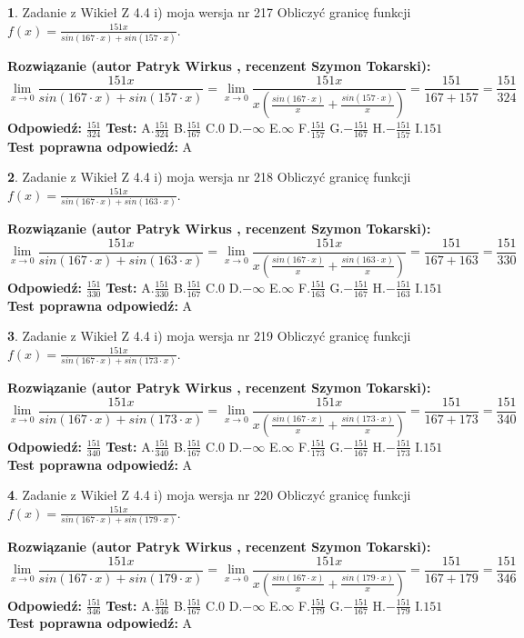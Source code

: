 \documentclass[12pt, a4paper]{article}
\theoremstyle{definition} %
\newtheorem{zad}{}
\newcommand{\zadStart}[1]{\begin{zad}#1\newline}
\newcommand{\zadStop}{\end{zad}}
\newcommand{\rozwStart}[2]{\noindent \textbf{Rozwiązanie (autor #1 , recenzent #2): }\newline}
\newcommand{\rozwStop}{\newline}
\newcommand{\odpStart}{\noindent \textbf{Odpowiedź:}\newline}
\newcommand{\odpStop}{\newline}
\newcommand{\testStart}{\noindent \textbf{Test:}\newline}
\newcommand{\testStop}{\newline}
\newcommand{\kluczStart}{\noindent \textbf{Test poprawna odpowiedź:}\newline}
\newcommand{\kluczStop}{\newline}
\begin{document}
\zadStart{Zadanie z Wikieł Z 4.4 i) moja wersja nr 217}
Obliczyć granicę funkcji $f(x)=\frac{151x}{sin(167\cdot x) +sin(157\cdot x)}$.
\zadStop
\rozwStart{Patryk Wirkus}{Szymon Tokarski}
$$\lim\limits_{x\to 0}\frac{151x}{sin(167\cdot x) +sin(157\cdot x)}=\lim\limits_{x\to 0}\frac{151x}{x(\frac{sin(167\cdot x)}{x}+\frac{sin(157\cdot x)}{x})}=\frac{151}{167+157} = \frac{151}{324}$$
\rozwStop
\odpStart
$\frac{151}{324}$
\odpStop
\testStart
A.$\frac{151}{324}$
B.$\frac{151}{167}$
C.$0$
D.$-\infty$
E.$\infty$
F.$\frac{151}{157}$
G.$-\frac{151}{167}$
H.$-\frac{151}{157}$
I.$151$
\testStop
\kluczStart
A
\kluczStop



\zadStart{Zadanie z Wikieł Z 4.4 i) moja wersja nr 218}
Obliczyć granicę funkcji $f(x)=\frac{151x}{sin(167\cdot x) +sin(163\cdot x)}$.
\zadStop
\rozwStart{Patryk Wirkus}{Szymon Tokarski}
$$\lim\limits_{x\to 0}\frac{151x}{sin(167\cdot x) +sin(163\cdot x)}=\lim\limits_{x\to 0}\frac{151x}{x(\frac{sin(167\cdot x)}{x}+\frac{sin(163\cdot x)}{x})}=\frac{151}{167+163} = \frac{151}{330}$$
\rozwStop
\odpStart
$\frac{151}{330}$
\odpStop
\testStart
A.$\frac{151}{330}$
B.$\frac{151}{167}$
C.$0$
D.$-\infty$
E.$\infty$
F.$\frac{151}{163}$
G.$-\frac{151}{167}$
H.$-\frac{151}{163}$
I.$151$
\testStop
\kluczStart
A
\kluczStop



\zadStart{Zadanie z Wikieł Z 4.4 i) moja wersja nr 219}
Obliczyć granicę funkcji $f(x)=\frac{151x}{sin(167\cdot x) +sin(173\cdot x)}$.
\zadStop
\rozwStart{Patryk Wirkus}{Szymon Tokarski}
$$\lim\limits_{x\to 0}\frac{151x}{sin(167\cdot x) +sin(173\cdot x)}=\lim\limits_{x\to 0}\frac{151x}{x(\frac{sin(167\cdot x)}{x}+\frac{sin(173\cdot x)}{x})}=\frac{151}{167+173} = \frac{151}{340}$$
\rozwStop
\odpStart
$\frac{151}{340}$
\odpStop
\testStart
A.$\frac{151}{340}$
B.$\frac{151}{167}$
C.$0$
D.$-\infty$
E.$\infty$
F.$\frac{151}{173}$
G.$-\frac{151}{167}$
H.$-\frac{151}{173}$
I.$151$
\testStop
\kluczStart
A
\kluczStop



\zadStart{Zadanie z Wikieł Z 4.4 i) moja wersja nr 220}
Obliczyć granicę funkcji $f(x)=\frac{151x}{sin(167\cdot x) +sin(179\cdot x)}$.
\zadStop
\rozwStart{Patryk Wirkus}{Szymon Tokarski}
$$\lim\limits_{x\to 0}\frac{151x}{sin(167\cdot x) +sin(179\cdot x)}=\lim\limits_{x\to 0}\frac{151x}{x(\frac{sin(167\cdot x)}{x}+\frac{sin(179\cdot x)}{x})}=\frac{151}{167+179} = \frac{151}{346}$$
\rozwStop
\odpStart
$\frac{151}{346}$
\odpStop
\testStart
A.$\frac{151}{346}$
B.$\frac{151}{167}$
C.$0$
D.$-\infty$
E.$\infty$
F.$\frac{151}{179}$
G.$-\frac{151}{167}$
H.$-\frac{151}{179}$
I.$151$
\testStop
\kluczStart
A
\kluczStop
\end{document}

